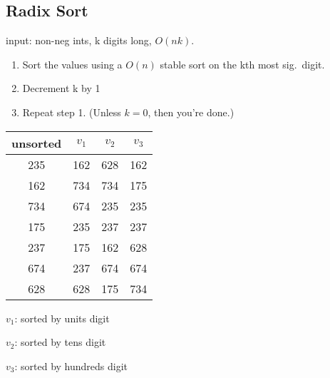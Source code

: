 
\subsection*{Radix Sort}

input: non-neg ints, k digits long, $O(nk)$.

\begin{enumerate}
    \item Sort the values using a $O(n)$ stable sort on the kth most sig.\ digit.
    \item Decrement k by 1
    \item Repeat step 1. (Unless $k=0$, then you're done.)
\end{enumerate}

\begin{tabular}{cccc}
    unsorted & $v_1$ & $v_2$ & $v_3$\\
    \toprule
    235 & 162 & 628 & 162\\
    162 & 734 & 734 & 175\\
    734 & 674 & 235 & 235\\
    175 & 235 & 237 & 237\\
    237 & 175 & 162 & 628\\
    674 & 237 & 674 & 674\\
    628 & 628 & 175 & 734
\end{tabular}

$v_1$: sorted by units digit

$v_2$: sorted by tens digit

$v_3$: sorted by hundreds digit
